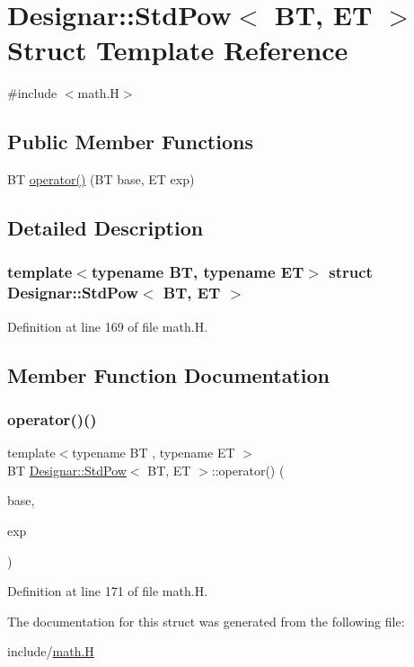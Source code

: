 \hypertarget{struct_designar_1_1_std_pow}{}\section{Designar\+:\+:Std\+Pow$<$ BT, ET $>$ Struct Template Reference}
\label{struct_designar_1_1_std_pow}


{\ttfamily \#include $<$math.\+H$>$}

\subsection*{Public Member Functions}
\begin{DoxyCompactItemize}
\item 
BT \hyperlink{struct_designar_1_1_std_pow_a76ed6112976493eda665ec60c537145f}{operator()} (BT base, ET exp)
\end{DoxyCompactItemize}


\subsection{Detailed Description}
\subsubsection*{template$<$typename BT, typename ET$>$\newline
struct Designar\+::\+Std\+Pow$<$ B\+T, E\+T $>$}



Definition at line 169 of file math.\+H.



\subsection{Member Function Documentation}
\mbox{\label{struct_designar_1_1_std_pow_a76ed6112976493eda665ec60c537145f}} 
\subsubsection{\texorpdfstring{operator()()}{operator()()}}
{\footnotesize\ttfamily template$<$typename BT , typename ET $>$ \\
BT \hyperlink{struct_designar_1_1_std_pow}{Designar\+::\+Std\+Pow}$<$ BT, ET $>$\+::operator() (\begin{DoxyParamCaption}\item[{BT}]{base,  }\item[{ET}]{exp }\end{DoxyParamCaption})\hspace{0.3cm}{\ttfamily [inline]}}



Definition at line 171 of file math.\+H.



The documentation for this struct was generated from the following file\+:\begin{DoxyCompactItemize}
\item 
include/\hyperlink{math_8_h}{math.\+H}\end{DoxyCompactItemize}
